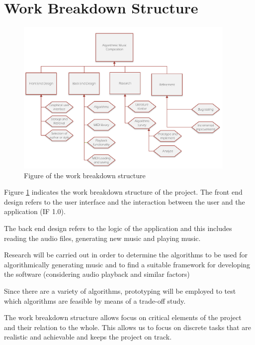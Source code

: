 

\section{Work Breakdown Structure}
\begin{figure}
\centerline{\includegraphics[width=400px]{../images/wbs.pdf}}
\caption{Figure of the work breakdown structure}
\label{ims:sdp}
\end{figure}

Figure \ref{ims:sdp} indicates the work breakdown structure of the project. 
The front end design refers to the user interface and the interaction between the user and the application (IF 1.0).

The back end design refers to the logic of the application and this includes reading the audio files, generating new music and playing music.

Research will be carried out in order to determine the algorithms to be used for algorithmically generating music and to find a suitable framework for developing the software (considering audio playback and similar factors)

Since there are a variety of algorithms, prototyping will be employed to test which algorithms are feasible by means of a trade-off study.

The work breakdown structure allows focus on critical elements of the project and their relation to the whole. This allows us to focus on discrete tasks that are realistic and achievable and keeps the project on track.


